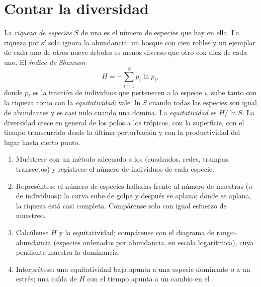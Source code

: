 \section{Contar la diversidad}

\begin{definition}\label{def:b1:ecosystem-organization:diversity}
La \emph{riqueza de especies} $S$ de una  es el número de especies
que hay en ella. La riqueza por sí sola ignora la abundancia: un bosque con
cien robles y un ejemplar de cada uno de otros nueve árboles es menos diverso
que otro con diez de cada uno. El \emph{índice de Shannon}
\[
H = -\sum_{i=1}^{S} p_i \ln p_i ,
\]
donde $p_i$ es la fracción de individuos que pertenecen a la especie $i$,
sube tanto con la riqueza como con la \emph{equitatividad}; vale $\ln S$
cuando todas las especies son igual de abundantes y es casi nulo cuando una
domina. La \emph{equitatividad} es $H/\ln S$. La diversidad crece en general
de los polos a los trópicos, con la superficie, con el tiempo transcurrido
desde la última perturbación y con la productividad del lugar hasta cierto
punto.
\end{definition}

\begin{method}\label{met:b1:ecosystem-organization:sampling}
\begin{enumerate}
  \item Muéstrese con un método adecuado a los  (cuadrados, redes,
        trampas, transectos) y regístrese el número de individuos de cada
        especie.
  \item Represéntese el número de especies halladas frente al número de
        muestras (o de individuos): la curva sube de golpe y después se
        aplana; donde se aplana, la riqueza está casi completa. Compárense
         solo con igual esfuerzo de muestreo.
  \item Calcúlense $H$ y la equitatividad; compárense con el diagrama de
        rango--abundancia (especies ordenadas por abundancia, en escala
        logarítmica), cuya pendiente muestra la dominancia.
  \item Interprétese: una equitatividad baja apunta a una especie dominante
        o a un estrés; una caída de $H$ con el tiempo apunta a un cambio en
        el .
\end{enumerate}
\end{method}

